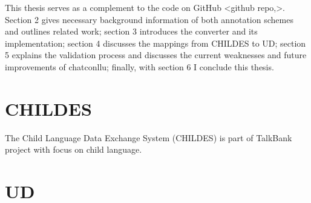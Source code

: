 This thesis serves as a complement to the code on GitHub <github repo,>. Section 2 gives necessary background information of both annotation schemes and outlines related work; section 3 introduces the converter and its implementation; section 4 discusses the mappings from CHILDES to UD; section 5 explains the validation process and discusses the current weaknesses and future improvements of chatconllu; finally, with section 6 I conclude this thesis.\\



\section{CHILDES}

The Child Language Data Exchange System (CHILDES) is part of TalkBank project with focus on child language.

\section{UD}

